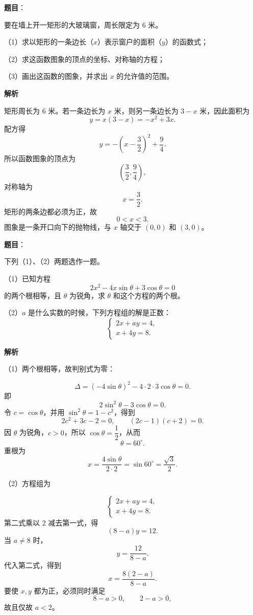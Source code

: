 \begin{answer}

\textbf{题目}：

要在墙上开一矩形的大玻璃窗，周长限定为 $6$ 米。

（1）求以矩形的一条边长（$x$）表示窗户的面积（$y$）的函数式；

（2）求这函数图象的顶点的坐标、对称轴的方程；

（3）画出这函数的图象，并求出 $x$ 的允许值的范围。

\textbf{解析}

矩形周长为 $6$ 米。若一条边长为 $x$ 米，则另一条边长为 $3-x$ 米，因此面积为
\[
y=x(3-x)=-x^2+3x.
\]
配方得
\[
y=-\left(x-\frac32\right)^2+\frac94.
\]
所以函数图象的顶点为
\[
\left(\frac32,\frac94\right),
\]
对称轴为
\[
x=\frac32.
\]
矩形的两条边都必须为正，故
\[
0<x<3.
\]
图象是一条开口向下的抛物线，与 $x$ 轴交于 $(0,0)$ 和 $(3,0)$。
\nopagebreak[4]
\begin{center}\end{center}
\nopagebreak[4]

\end{answer}
\begin{answer}

\textbf{题目}：

下列（1）、（2）两题选作一题。

（1）已知方程
\[
2x^2-4x\sin\theta+3\cos\theta=0
\]
的两个根相等，且 $\theta$ 为锐角，求 $\theta$ 和这个方程的两个根。

（2）$a$ 是什么实数的时候，下列方程组的解是正数：
\[
\begin{cases}
2x+ay=4,\\
x+4y=8.
\end{cases}
\]

\textbf{解析}

（1）两个根相等，故判别式为零：

\[
\Delta=(-4\sin\theta)^2-4\cdot2\cdot3\cos\theta=0.
\]
即
\[
2\sin^2\theta-3\cos\theta=0.
\]
令 $c=\cos\theta$，并用 $\sin^2\theta=1-c^2$，得到
\[
2c^2+3c-2=0,
\qquad (2c-1)(c+2)=0.
\]
因 $\theta$ 为锐角，$c>0$，所以 $\cos\theta=\dfrac12$，从而
\[
\theta=60^\circ.
\]
重根为
\[
x=\frac{4\sin\theta}{2\cdot2}=\sin60^\circ=\frac{\sqrt3}{2}.
\]

（2）方程组为

\[
\begin{cases}
2x+ay=4,\\
x+4y=8.
\end{cases}
\]
第二式乘以 $2$ 减去第一式，得
\[
(8-a)y=12.
\]
当 $a\ne8$ 时，
\[
y=\frac{12}{8-a}.
\]
代入第二式，得到
\[
x=\frac{8(2-a)}{8-a}.
\]
要使 $x,y$ 都为正，必须同时满足
\[
8-a>0,\qquad 2-a>0,
\]
故且仅故 $a<2$。


\end{answer}